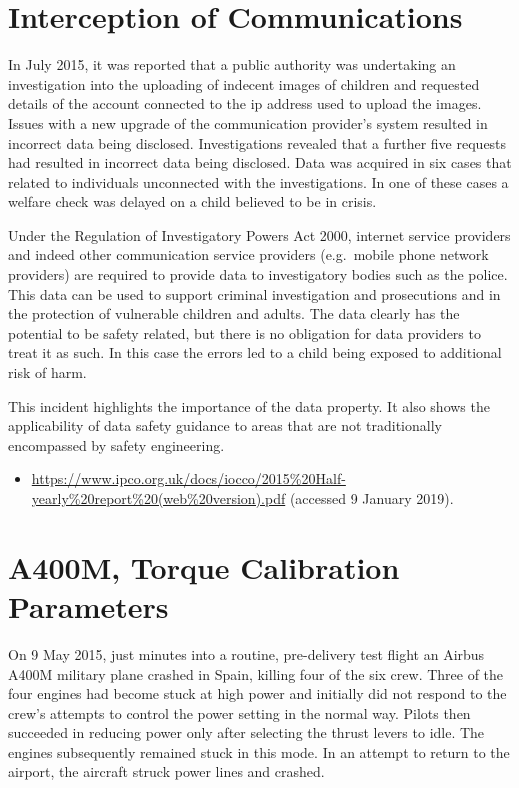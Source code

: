 \section{Interception of Communications} \label{bkm:incacc:comintercept}
In July 2015, it was reported that a public authority was undertaking an investigation into the uploading of indecent images of children and requested details of the account connected to the \gls{ip} address used to upload the images. Issues with a new upgrade of the communication provider's system resulted in incorrect data being disclosed. Investigations revealed that a further five requests had resulted in incorrect data being disclosed. Data was acquired in six cases that related to individuals unconnected with the investigations. In one of these cases a welfare check was delayed on a child believed to be in crisis.

Under the Regulation of Investigatory Powers Act 2000, internet service providers and indeed other communication service providers (e.g.\ mobile phone network providers) are required to provide data to investigatory bodies such as the police. This data can be used to support criminal investigation and prosecutions and in the protection of vulnerable children and adults. The data clearly has the potential to be safety related, but there is no obligation for data providers to treat it as such. In this case the \glspl{error} led to a child being exposed to additional risk of harm.

This incident highlights the importance of the  \gls{data property}. It also shows the applicability of data safety guidance to areas that are not traditionally encompassed by safety engineering.

\begin{samepage}
\begin{itemize}
  \item \raggedright{\href{https://www.ipco.org.uk/docs/iocco/2015\%20Half-yearly\%20report\%20(web\%20version).pdf}{https://www.ipco.org.uk/docs/iocco/2015\%20Half-yearly\%20report\%20(web\%20version).pdf} (accessed 9 January 2019).}
\end{itemize}
\end{samepage}

\section{A400M, Torque Calibration Parameters} \label{bkm:incacc:a400m}
On 9 May 2015, just minutes into a routine, pre-delivery test flight an Airbus A400M military plane crashed in Spain, killing four of the six crew. Three of the four engines had become stuck at high power and initially did not respond to the crew's attempts to control the power setting in the normal way. Pilots then succeeded in reducing power only after selecting the thrust levers to idle. The engines subsequently remained stuck in this mode. In an attempt to return to the airport, the aircraft struck power lines and crashed.  

